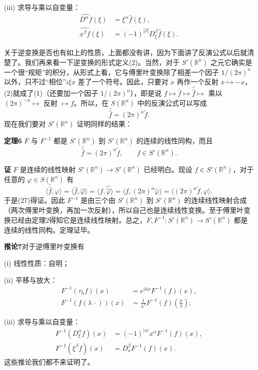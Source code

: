 (iii) 求导与乘以自变量：
\begin{align}
 \widehat{D^\alpha f}(\xi)&=\xi^\alpha\widehat f(\xi),
 \tag{26a}\\
 \widehat{x^\beta f}(\xi)&=(-1)^{|\beta|}D_\xi^\beta\widehat f(\xi).
 \tag{26b}
\end{align}

关于逆变换是否也有如上的性质，上面都没有讲，因为下面讲了反演公式以后就清楚了。我们再来看一下逆变换的形式定义(2)。当然，对于 $S'(\mathbb R^n)$ 之元它确实是一个很“规矩”的积分，从形式上看，它与傅里叶变换除了相差一个因子 $1/(2\pi)^n$ 以外，只不过“相位”$i\xi x$ 差了一个符号。因此，只要对 $x$ 再作一个反射 $x\mapsto-x$，(2)就成了(1)（还要加一个因子 $1/(2\pi)^n$），即是说 $f\mapsto\widehat f\mapsto\widehat{\widehat f}\mapsto$ 乘以 $(2\pi)^{-n}\mapsto$ 反射 $\mapsto f$。所以，在 $S(\mathbb R^n)$ 中的反演公式可以写成
\[
 \widehat{\widehat f}=(2\pi)^n\widetilde f.
\]
现在我们要对 $S'(\mathbb R^n)$ 证明同样的结果：

\noindent\textbf{定理6}\quad
$F$ 与 $F^{-1}$ 都是 $S'(\mathbb R^n)$ 到 $S'(\mathbb R^n)$ 的连续的线性同构，而且
\begin{equation}
 \widehat{\widehat f}=(2\pi)^n\widetilde f,
 \qquad f\in S'(\mathbb R^n).
 \tag{27}
\end{equation}

\noindent\textbf{证}\quad
$F$ 是连续的线性映射 $S'(\mathbb R^n)\to S'(\mathbb R^n)$ 已经明白。现设 $f\in S'(\mathbb R^n)$，对于任意的 $\varphi\in S(\mathbb R^n)$ 有
\[
 \langle\widehat{\widehat f},\varphi\rangle
 =\langle\widehat f,\widehat\varphi\rangle
 =\langle f,\widehat{\widehat\varphi}\rangle
 =\langle f,(2\pi)^n\widetilde\varphi\rangle
 =\langle(2\pi)^n\widetilde f,\varphi\rangle.
\]
于是(27)得证。因此 $F^{-1}$ 是由三个由 $S'(\mathbb R^n)$ 到 $S'(\mathbb R^n)$ 的连续线性映射合成（两次傅里叶变换，再加一次反射），所以自己也是连续线性变换。至于傅里叶变换已经由定理2得知它是连续线性映射。总之，$F,F^{-1}:S'(\mathbb R^n)\to S'(\mathbb R^n)$ 都是连续的线性同构。定理证毕。

\noindent\textbf{推论7}\quad 对于逆傅里叶变换有

(i) 线性性质：自明；

(ii) 平移与放大：
\begin{align}
 F^{-1}(\tau_hf)(x)&=e^{ihx}F^{-1}(f)(x),
 \tag{28a}\\
 F^{-1}(f(\lambda\,\cdot))(x)&=\frac1{\lambda^n}F^{-1}(f)\!\left(\frac x\lambda\right);
 \tag{28b}
\end{align}

(iii) 求导与乘以自变量：
\begin{align}
 F^{-1}(D_\xi^\alpha f)(x)&=(-1)^{|\alpha|}x^\alpha F^{-1}(f)(x),
 \tag{29a}\\
 F^{-1}(\xi^\beta f)(x)&=D_x^\beta F^{-1}(f)(x).
 \tag{29b}
\end{align}
这些推论我们都不来证明了。

